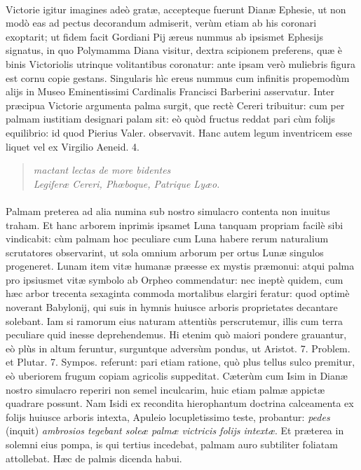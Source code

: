 \documentclass[a4paper, 11pt, oneside, polutonikogreek, latin]{article}
\begin{document}
\paragraph{}
Victorie igitur imagines adeò gratæ, accepteque fuerunt Dianæ Ephesie, ut non modò eas ad pectus decorandum admiserit, verùm etiam ab his
coronari exoptarit; ut fidem facit Gordiani Pij æreus nummus ab ipsismet Ephesijs signatus, in quo Polymamma Diana visitur, dextra scipionem preferens, quæ è binis Victoriolis utrinque volitantibus coronatur: ante ipsam verò muliebris figura est cornu copie gestans. Singularis hìc ereus nummus cum infinitis propemodùm alijs in Museo Eminentissimi Cardinalis Francisci Barberini asservatur. Inter præcipua Victorie argumenta palma surgit, que rectè Cereri tribuitur: cum per palmam iustitiam designari palam sit: eò quòd fructus reddat pari cùm folijs equilibrio: id quod Pierius Valer. observavit. Hanc autem legum inventricem esse liquet vel ex Virgilio Aeneid. 4.
\begin{quote}
\hspace*{15mm}\emph{mactant lectas de more bidentes}\\
\emph{Legiferæ Cereri, Phœboque, Patrique Lyæo.}\\
\end{quote}
\paragraph{}
Palmam preterea ad alia numina sub nostro simulacro contenta non inuitus traham. Et hanc arborem inprimis ipsamet Luna tanquam propriam facilè sibi vindicabit: cùm palmam hoc peculiare cum Luna habere rerum naturalium scrutatores observarint, ut sola omnium arborum per ortus Lunæ singulos progeneret. Lunam item vitæ humanæ præesse ex mystis præmonui: atqui palma pro ipsiusmet vitæ symbolo ab Orpheo commendatur: nec ineptè quidem, cum hæc arbor trecenta sexaginta commoda mortalibus elargiri feratur: quod optimè noverant Babylonij, qui suis in hymnis huiusce arboris proprietates decantare solebant. Iam si ramorum eius naturam attentiùs perscrutemur, illis cum terra peculiare quid inesse deprehendemus. Hi etenim quò maiori pondere grauantur, eò plùs in altum feruntur, surguntque adversùm pondus, ut Aristot. 7. Problem. et Plutar. 7. Sympos. referunt: pari etiam ratione, quò plus tellus sulco premitur, eò uberiorem frugum copiam agricolis suppeditat. Cæterùm cum Isim in Dianæ nostro simulacro reperiri non semel inculcarim, huic etiam palmæ appictæ quadrare possunt. Nam Isidi ex recondita hierophantum doctrina calceamenta ex folijs huiusce arboris intexta, Apuleio locupletissimo teste, probantur: \emph{pedes} (inquit) \emph{ambrosios tegebant soleæ palmæ victricis folijs intextæ}. Et præterea in solemni eius pompa, is qui tertius incedebat, palmam auro subtiliter foliatam attollebat. Hæc de palmis dicenda habui.
\clearpage
\end{document}
